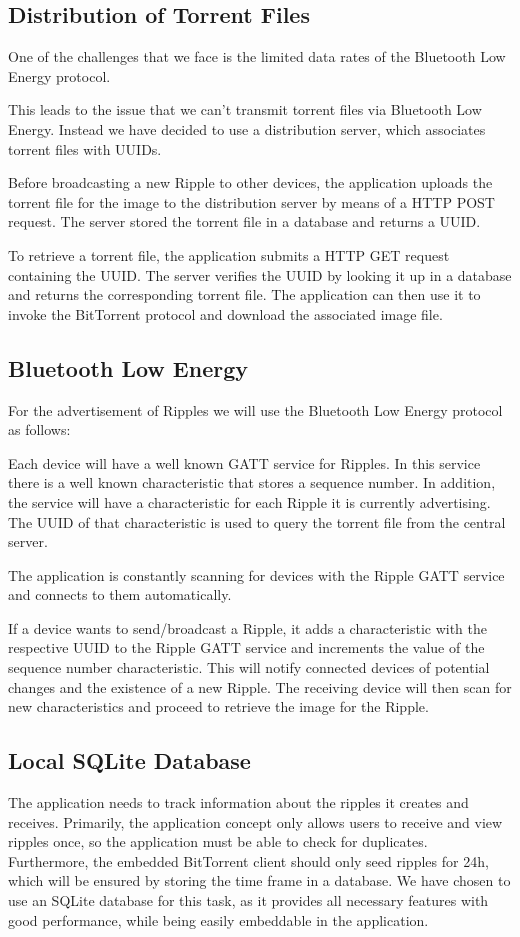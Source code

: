 \documentclass{report}
\begin{document}
\subsection{Distribution of Torrent Files}
One of the challenges that we face is the limited data rates of the Bluetooth Low Energy protocol.

This leads to the issue that we can't transmit torrent files via Bluetooth Low Energy. Instead we have decided to use a distribution server, which associates torrent files with UUIDs.

Before broadcasting a new Ripple to other devices, the application uploads the torrent file for the image to the distribution server by means of a HTTP POST request. The server stored the torrent file in a database and returns a UUID. 

To retrieve a torrent file, the application submits a HTTP GET request containing the UUID. The server verifies the UUID by looking it up in a database and returns the corresponding torrent file. The application can then use it to invoke the BitTorrent protocol and download the associated image file.

\subsection{Bluetooth Low Energy}
For the advertisement of Ripples we will use the Bluetooth Low Energy protocol as follows:

Each device will have a well known GATT service for Ripples. In this service there is a well known characteristic that stores a sequence number. In addition, the service will have a characteristic for each Ripple it is currently advertising. The UUID of that characteristic is used to query the torrent file from the central server.

The application is constantly scanning for devices with the Ripple GATT service and connects to them automatically.

If a device wants to send/broadcast a Ripple, it adds a characteristic with the respective UUID to the Ripple GATT service and increments the value of the sequence number characteristic. This will notify connected devices of potential changes and the existence of a new Ripple. The receiving device will then scan for new characteristics and proceed to retrieve the image for the Ripple.

\subsection{Local SQLite Database}
The application needs to track information about the ripples it creates and receives. Primarily, the application concept only allows users to receive and view ripples once, so the application must be able to check for duplicates. Furthermore, the embedded BitTorrent client should only seed ripples for 24h, which will be ensured by storing the time frame in a database.
We have chosen to use an SQLite database for this task, as it provides all necessary features with good performance, while being easily embeddable in the application.
\end{document}
